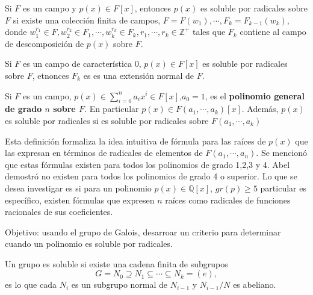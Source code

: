 \begin{definicion}
    Si $F$ es un campo y $p(x)\in F[x]$, entonces $p(x)$ es soluble por radicales sobre $F$ si existe una colección finita de campos, $F=F(w_1),\cdots, F_k=F_{k-1}(w_k)$, donde $w_1^{r_1}\in F, w_2^{r_2}\in F_1,\cdots, w_k^{r_k}\in F_k, r_1,\cdots, r_k\in \mathbb{Z}^+$ tales que $F_k$ contiene al campo de descomposición de $p(x)$ sobre $F$. 
\end{definicion}

\begin{prop}
    Si $F$ es un campo de característica 0, $p(x)\in F[x]$ es soluble por radicales sobre $F$, etnonces $F_k$ es es una extensión normal de $F$.
\end{prop}
\begin{definicion}
    Si $F$ es un campo, $p(x)\in \sum_{i=0}^na_ix^i\in F[x]$,$a_0=1$, es el \textbf{polinomio general de grado $n$ sobre $F$}. En particular $p(x)\in F(a_1,\cdots,a_k)[x]$. Además, $p(x)$ es soluble por radicales si es soluble por radicales sobre $F(a_1,\cdots,a_k)$
\end{definicion}

\begin{nota}
    Esta definición formaliza la idea intuitiva de fórmula para las raíces de $p(x)$ que las expresan en términos de radicales de elementos de $F(a_1,\cdots,a_n)$. Se mencionó que estas fórmulas existen para todos los polinomios de grado 1,2,3 y 4. Abel demostró no existen para todos los polinomios de grado 4 o superior. Lo que se desea investigar es si para un polinomio $p(x)\in \mathbb{Q}[x]$, $gr(p)\geq 5$ particular es específico, existen fórmulas que expresen $n$ raíces como radicales de funciones racionales de sus coeficientes.  
\end{nota}

\begin{nota}
    Objetivo: usando el grupo de Galois, desarroar un criterio para determinar cuando un polinomio es soluble por radicales. 
\end{nota}
\begin{definicion}
    Un grupo es soluble si existe una cadena finita de subgrupos 
    $$G=N_0\supseteq N_1\subseteq\cdots \subseteq N_k=(e),$$
    es lo que cada $N_i$ es un subgrupo normal de $N_{i-1}$ y $N_{i-1}/N$ es abeliano.
\end{definicion}

